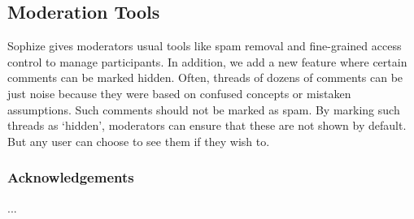 \documentclass[a4paper]{article}
\begin{document}
\subsection{Moderation Tools}

Sophize gives moderators usual tools like spam removal and fine-grained access control to manage participants. In addition, we add a new feature where certain comments can be marked hidden. Often, threads of dozens of comments can be just noise because they were based on confused concepts or mistaken assumptions. Such comments should not be marked as spam. By marking such threads as `hidden', moderators can ensure that these are not shown by default. But any user can choose to see them if they wish to.



\subsubsection*{Acknowledgements}

...


 








\end{document}
